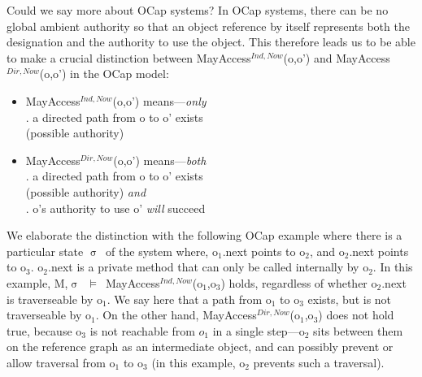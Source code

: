 \documentclass[a4paper,11pt, twoside,twocolumn]{article}
\newcommand{\losigma}{$\upsigma$}
\newcommand{\loturns} {$\vDash$}
\newcommand{\ablock} {\null\qquad}
\begin{document}
Could we say more about OCap systems? In OCap systems, there can be no global ambient authority so that an object reference by itself represents both the designation and the authority to use the object. This therefore leads us to be able to make a crucial distinction between MayAccess$^{Ind,Now}$(o,o') and MayAccess$^{Dir,Now}$(o,o') in the OCap model:
\begin{itemize}
\item MayAccess$^{Ind,Now}$(o,o') means---\textit{only}\\
\ablock 1. a directed path from o to o' exists\\
\ablock\ablock (possible authority)
\item MayAccess$^{Dir,Now}$(o,o') means---\textit{both}\\
\ablock 1. a directed path from o to o' exists\\
\ablock\ablock (possible authority) \textit{and}\\
\ablock 2. o's authority to use o' \textit{will} succeed
\end{itemize}
We elaborate the distinction with the following OCap example where there is a particular state \losigma\ of the system where, o$_1$.next points to o$_2$, and o$_2$.next points to o$_3$. o$_2$.next is a private method that can only be called internally by o$_2$. In this example, M,\losigma ~\loturns ~MayAccess$^{Ind,Now}$(o$_1$,o$_3$) holds, regardless of whether o$_2$.next is traverseable by o$_1$. We say here that a path from o$_1$ to o$_3$ exists, but is not traverseable by o$_1$. On the other hand, MayAccess$^{Dir,Now}$(o$_1$,o$_3$) does not hold true, because o$_3$ is not reachable from $o_1$ in a single step---o$_2$ sits between them on the reference graph as an intermediate object, and can possibly prevent or allow traversal from o$_1$ to o$_3$ (in this example, o$_2$ prevents such a traversal).\\
\end{document}
